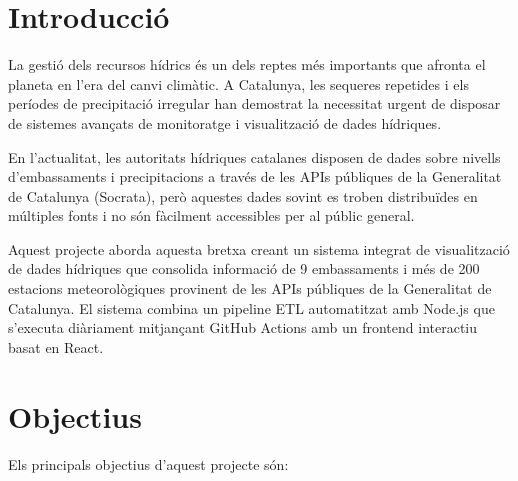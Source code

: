 \documentclass[11pt, a4paper]{article}
\begin{document}
\restoregeometry
\newpage


\setcounter{page}{1}
\pagestyle{fancy}


\section{Introducció}

La gestió dels recursos hídrics és un dels reptes més importants que afronta el planeta en l'era del canvi climàtic. A Catalunya, les sequeres repetides i els períodes de precipitació irregular han demostrat la necessitat urgent de disposar de sistemes avançats de monitoratge i visualització de dades hídriques.

En l'actualitat, les autoritats hídriques catalanes disposen de dades sobre nivells d'embassaments i precipitacions a través de les APIs públiques de la Generalitat de Catalunya (Socrata), però aquestes dades sovint es troben distribuïdes en múltiples fonts i no són fàcilment accessibles per al públic general.

Aquest projecte aborda aquesta bretxa creant un sistema integrat de visualització de dades hídriques que consolida informació de 9 embassaments i més de 200 estacions meteorològiques provinent de les APIs públiques de la Generalitat de Catalunya. El sistema combina un pipeline ETL automatitzat amb Node.js que s'executa diàriament mitjançant GitHub Actions amb un frontend interactiu basat en React.


\section{Objectius}

Els principals objectius d'aquest projecte són:
\end{document}
